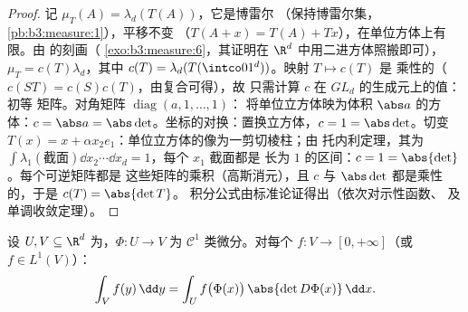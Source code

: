\begin{proof}
记 $\mu_T(A) = \lambda_d(T(A))$，它是博雷尔
（保持博雷尔集，
\cref{pb:b3:measure:1}），平移不变
（$T(A + x) = T(A) + Tx$），在单位方体上有限。由
的刻画（
\cref{exo:b3:measure:6}，其证明在
$\R^d$ 中用二进方体照搬即可），$\mu_T = c(T)\lambda_d$，其中 $c(T)
= \lambda_d(T(\intco01^d))$。映射 $T \mapsto c(T)$ 是
乘性的（$c(ST) = c(S)c(T)$，由复合可得），故
只需计算 $c$ 在 $GL_d$ 的生成元上的值：初等
矩阵。对角矩阵 $\operatorname{diag}(a, 1, \dots, 1)$：
将单位立方体映为体积 $\abs a$ 的方体：$c = \abs a =
\abs\det$。坐标的对换：置换立方体，$c
= 1 = \abs\det$。切变 $T(x) = x + \alpha
x_2e_1$：单位立方体的像为一剪切棱柱；由
托内利定理，其为 $\int\lambda_1(\text{截面})\dd x_2
\cdots \dd x_d = 1$，每个 $x_1$ 截面都是
长为 $1$ 的区间：$c = 1 = \abs{\det}$。每个可逆矩阵都是
这些矩阵的乘积（高斯消元），且 $c$ 与
$\abs\det$ 都是乘性的，于是 $c(T) = \abs{\det T}$。
积分公式由标准论证得出（依次对示性函数、
及单调收敛定理）。
\end{proof}

\begin{theorem}[变量替换]\label{thm:b3:product:changeofvar}
设 $U, V \subseteq \R^d$ 为，$\Phi \colon U \to V$ 为
$\mathcal C^1$ 类微分。对每个 $f \colon V
\to [0, +\infty]$（或 $f \in L^1(V)$）：
\[
\int_V f(y)\,\dd y = \int_U
f\bigl(\Phi(x)\bigr)\,\abs{\det D\Phi(x)}\,\dd x .
\]
\end{theorem}

